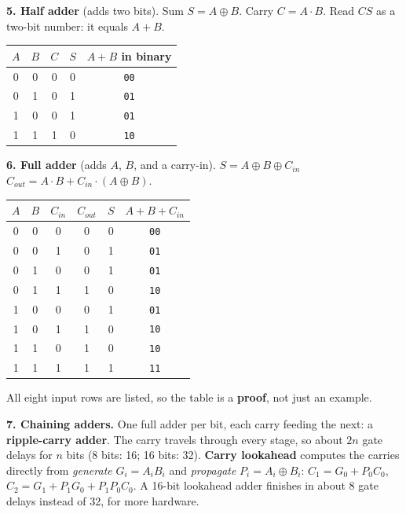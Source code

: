 \documentclass[10pt,letterpaper]{article}
\begin{document}
\textbf{5. Half adder} (adds two bits). Sum $S=A\oplus B$. Carry $C=A\cdot B$. Read $CS$ as a two-bit number: it equals $A+B$.
\begin{center}
\begin{tabular}{cc|cc|c}
$A$&$B$&$C$&$S$&$A+B$ in binary\\\hline
0&0&0&0&\texttt{00}\\
0&1&0&1&\texttt{01}\\
1&0&0&1&\texttt{01}\\
1&1&1&0&\texttt{10}
\end{tabular}
\end{center}

\textbf{6. Full adder} (adds $A$, $B$, and a carry-in). $S=A\oplus B\oplus C_{in}$ \quad $C_{out}=A\cdot B+C_{in}\cdot(A\oplus B)$.
\begin{center}
\begin{tabular}{ccc|cc|c}
$A$&$B$&$C_{in}$&$C_{out}$&$S$&$A+B+C_{in}$\\\hline
0&0&0&0&0&\texttt{00}\\
0&0&1&0&1&\texttt{01}\\
0&1&0&0&1&\texttt{01}\\
0&1&1&1&0&\texttt{10}\\
1&0&0&0&1&\texttt{01}\\
1&0&1&1&0&\texttt{10}\\
1&1&0&1&0&\texttt{10}\\
1&1&1&1&1&\texttt{11}
\end{tabular}
\end{center}
All eight input rows are listed, so the table is a \textbf{proof}, not just an example.

\textbf{7. Chaining adders.} One full adder per bit, each carry feeding the next: a \textbf{ripple-carry adder}. The carry travels through every stage, so about $2n$ gate delays for $n$ bits (8 bits: 16; 16 bits: 32). \textbf{Carry lookahead} computes the carries directly from \emph{generate} $G_i=A_iB_i$ and \emph{propagate} $P_i=A_i\oplus B_i$: $C_1=G_0+P_0C_0$, $C_2=G_1+P_1G_0+P_1P_0C_0$. A 16-bit lookahead adder finishes in about 8 gate delays instead of 32, for more hardware.
\end{document}
